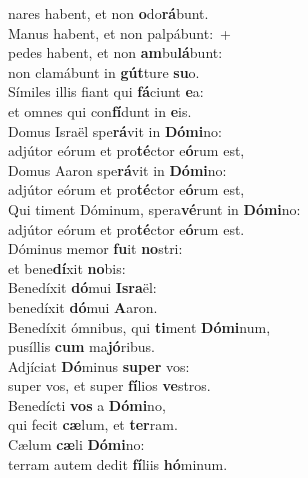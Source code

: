 \evenverse nares habent, et non \textbf{o}do\textbf{rá}bunt.\\
\oddverse Manus habent, et non palpábunt:~+\\
\oddverse  pedes habent, et non \textbf{am}bu\textbf{lá}bunt:~\*\\
\oddverse non clamábunt in \textbf{gút}ture \textbf{su}o.\\
\evenverse Símiles illis fiant qui \textbf{fá}ciunt \textbf{e}a:~\*\\
\evenverse et omnes qui con\textbf{fí}dunt in \textbf{e}is.\\
\oddverse Domus Israël spe\textbf{rá}vit in \textbf{Dó}\textbf{mi}no:~\*\\
\oddverse adjútor eórum et pro\textbf{té}ctor e\textbf{ó}rum est,\\
\evenverse Domus Aaron spe\textbf{rá}vit in \textbf{Dó}\textbf{mi}no:~\*\\
\evenverse adjútor eórum et pro\textbf{té}ctor e\textbf{ó}rum est,\\
\oddverse Qui timent Dóminum, spera\textbf{vé}runt in \textbf{Dó}\textbf{mi}no:~\*\\
\oddverse adjútor eórum et pro\textbf{té}ctor e\textbf{ó}rum est.\\
\evenverse Dóminus memor \textbf{fu}it \textbf{no}stri:~\*\\
\evenverse et bene\textbf{dí}xit \textbf{no}bis:\\
\oddverse Benedíxit \textbf{dó}mui \textbf{Is}\textbf{ra}ël:~\*\\
\oddverse benedíxit \textbf{dó}mui \textbf{A}aron.\\
\evenverse Benedíxit ómnibus, qui \textbf{ti}ment \textbf{Dó}\textbf{mi}num,~\*\\
\evenverse pusíllis \textbf{cum} ma\textbf{jó}ribus.\\
\oddverse Adjíciat \textbf{Dó}minus \textbf{su}\textbf{per} vos:~\*\\
\oddverse super vos, et super \textbf{fí}lios \textbf{ve}stros.\\
\evenverse Benedícti \textbf{vos} a \textbf{Dó}\textbf{mi}no,~\*\\
\evenverse qui fecit \textbf{cæ}lum, et \textbf{ter}ram.\\
\oddverse Cælum \textbf{cæ}li \textbf{Dó}\textbf{mi}no:~\*\\
\oddverse terram autem dedit \textbf{fí}liis \textbf{hó}minum.\\

